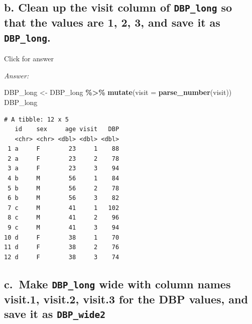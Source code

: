 \documentclass[
]{book}
\newenvironment{Shaded}{\begin{snugshade}}{\end{snugshade}}
\newcommand{\AttributeTok}[1]{\textcolor[rgb]{0.13,0.29,0.53}{#1}}
\newcommand{\FunctionTok}[1]{\textcolor[rgb]{0.13,0.29,0.53}{\textbf{#1}}}
\newcommand{\NormalTok}[1]{#1}
\newcommand{\OtherTok}[1]{\textcolor[rgb]{0.56,0.35,0.01}{#1}}
\newcommand{\SpecialCharTok}[1]{\textcolor[rgb]{0.81,0.36,0.00}{\textbf{#1}}}
\begin{document}
\hypertarget{b.-clean-up-the-visit-column-of-dbp_long-so-that-the-values-are-1-2-3-and-save-it-as-dbp_long.}{%
\subsection{\texorpdfstring{b. Clean up the visit column of \texttt{DBP\_long} so that the values are 1, 2, 3, and save it as \texttt{DBP\_long}.}{b. Clean up the visit column of DBP\_long so that the values are 1, 2, 3, and save it as DBP\_long.}}\label{b.-clean-up-the-visit-column-of-dbp_long-so-that-the-values-are-1-2-3-and-save-it-as-dbp_long.}}

Click for answer

\emph{Answer:}

\begin{Shaded}
\begin{Highlighting}[]
\NormalTok{DBP\_long }\OtherTok{\textless{}{-}}\NormalTok{ DBP\_long }\SpecialCharTok{\%\textgreater{}\%}
  \FunctionTok{mutate}\NormalTok{(}\AttributeTok{visit =} \FunctionTok{parse\_number}\NormalTok{(visit))}
\NormalTok{DBP\_long}
\end{Highlighting}
\end{Shaded}

\begin{verbatim}
# A tibble: 12 x 5
   id    sex     age visit   DBP
   <chr> <chr> <dbl> <dbl> <dbl>
 1 a     F        23     1    88
 2 a     F        23     2    78
 3 a     F        23     3    94
 4 b     M        56     1    84
 5 b     M        56     2    78
 6 b     M        56     3    82
 7 c     M        41     1   102
 8 c     M        41     2    96
 9 c     M        41     3    94
10 d     F        38     1    70
11 d     F        38     2    76
12 d     F        38     3    74
\end{verbatim}

\hypertarget{c.-make-dbp_long-wide-with-column-names-visit.1-visit.2-visit.3-for-the-dbp-values-and-save-it-as-dbp_wide2}{%
\subsection{\texorpdfstring{c.~Make \texttt{DBP\_long} wide with column names visit.1, visit.2, visit.3 for the DBP values, and save it as \texttt{DBP\_wide2}}{c.~Make DBP\_long wide with column names visit.1, visit.2, visit.3 for the DBP values, and save it as DBP\_wide2}}\label{c.-make-dbp_long-wide-with-column-names-visit.1-visit.2-visit.3-for-the-dbp-values-and-save-it-as-dbp_wide2}}
\end{document}
